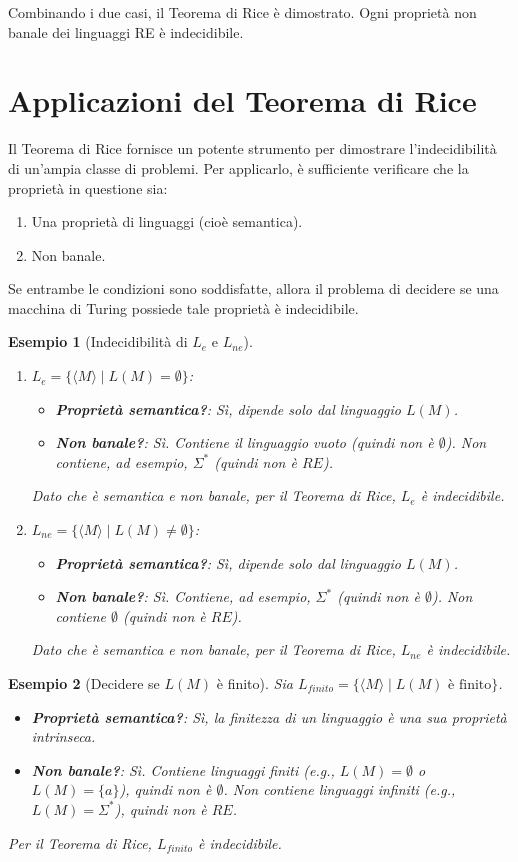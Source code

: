 \documentclass[a4paper]{article}
\newtheorem{example}{Esempio}
\begin{document}
Combinando i due casi, il Teorema di Rice è dimostrato. Ogni proprietà non banale dei linguaggi RE è indecidibile.

\section{Applicazioni del Teorema di Rice}
Il Teorema di Rice fornisce un potente strumento per dimostrare l'indecidibilità di un'ampia classe di problemi. Per applicarlo, è sufficiente verificare che la proprietà in questione sia:
\begin{enumerate}
    \item Una proprietà di linguaggi (cioè semantica).
    \item Non banale.
\end{enumerate}
Se entrambe le condizioni sono soddisfatte, allora il problema di decidere se una macchina di Turing possiede tale proprietà è indecidibile.

\begin{example}[Indecidibilità di $L_e$ e $L_{ne}$]
\begin{enumerate}
    \item $L_e = \{\langle M \rangle \mid L(M) = \emptyset\}$:
    \begin{itemize}
        \item \textbf{Proprietà semantica?}: Sì, dipende solo dal linguaggio $L(M)$.
        \item \textbf{Non banale?}: Sì. Contiene il linguaggio vuoto (quindi non è $\emptyset$). Non contiene, ad esempio, $\Sigma^*$ (quindi non è $RE$).
    \end{itemize}
    Dato che è semantica e non banale, per il Teorema di Rice, $L_e$ è indecidibile.
    \item $L_{ne} = \{\langle M \rangle \mid L(M) \neq \emptyset\}$:
    \begin{itemize}
        \item \textbf{Proprietà semantica?}: Sì, dipende solo dal linguaggio $L(M)$.
        \item \textbf{Non banale?}: Sì. Contiene, ad esempio, $\Sigma^*$ (quindi non è $\emptyset$). Non contiene $\emptyset$ (quindi non è $RE$).
    \end{itemize}
    Dato che è semantica e non banale, per il Teorema di Rice, $L_{ne}$ è indecidibile.
\end{enumerate}
\end{example}

\begin{example}[Decidere se $L(M)$ è finito]
Sia $L_{finito} = \{\langle M \rangle \mid L(M) \text{ è finito}\}$.
\begin{itemize}
    \item \textbf{Proprietà semantica?}: Sì, la finitezza di un linguaggio è una sua proprietà intrinseca.
    \item \textbf{Non banale?}: Sì. Contiene linguaggi finiti (e.g., $L(M)=\emptyset$ o $L(M)=\{a\}$), quindi non è $\emptyset$. Non contiene linguaggi infiniti (e.g., $L(M)=\Sigma^*$), quindi non è $RE$.
\end{itemize}
Per il Teorema di Rice, $L_{finito}$ è indecidibile.
\end{example}
\end{document}
